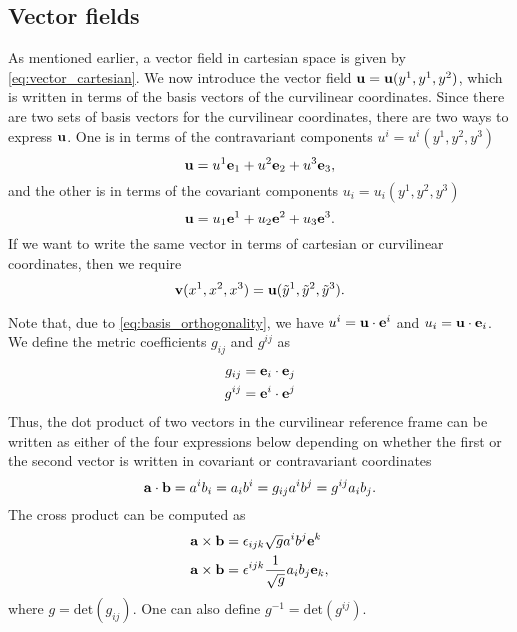 \documentclass[11pt]{article}
\newcommand{\ytilde}{\tilde{y}}
\begin{document}
\subsection{Vector fields}
As mentioned earlier, a vector field in cartesian space is given by \cref{eq:vector_cartesian}. We now introduce the vector field $\mathbf{u} = \mathbf{u}(y^1, y^1, y^2)$, which is written in terms of the basis vectors of the curvilinear coordinates. Since there are two sets of basis vectors for the curvilinear coordinates, there are two ways to express $\mathbf{u}$. One is in terms of the contravariant components $u^i = u^i(y^1, y^2, y^3)$
\begin{equation}
    \mathbf{u} = u^1 \mathbf{e}_1 + u^2 \mathbf{e}_2 + u^3 \mathbf{e}_3,
\end{equation}
and the other is in terms of the covariant components $u_i = u_i(y^1, y^2, y^3)$
\begin{equation}
    \mathbf{u} = u_1 \mathbf{e}^1 + u_2 \mathbf{e}^2 + u_3 \mathbf{e}^3.
\end{equation}
If we want to write the same vector in terms of cartesian or curvilinear coordinates, then we require
\begin{equation}
    \vvec(x^1, x^2, x^3) = \uvec(\ytilde^1, \ytilde^2, \ytilde^3).
\end{equation}

Note that, due to \cref{eq:basis_orthogonality}, we have $u^i = \mathbf{u} \cdot \mathbf{e}^i$ and $u_i = \mathbf{u} \cdot \mathbf{e}_i$. We define the metric coefficients $g_{ij}$ and $g^{ij}$ as
\begin{align}
    g_{ij} &= \mathbf{e}_i \cdot \mathbf{e}_j \\
    g^{ij} &= \mathbf{e}^i \cdot \mathbf{e}^j \\
\end{align}
Thus, the dot product of two vectors in the curvilinear reference frame can be written as either of the four expressions below depending on whether the first or the second vector is written in covariant or contravariant coordinates
\begin{equation}
\mathbf{a} \cdot \mathbf{b} = a^i b_i = a_i b^i = g_{ij} a^i b^j = g^{ij} a_i b_j.
\end{equation}
The cross product can be computed as
\begin{align}
    \mathbf{a} \times \mathbf{b} &= \epsilon_{ijk} \sqrt{g} a^i b^j \mathbf{e}^k \\
    \mathbf{a} \times \mathbf{b} &= \epsilon^{ijk} \frac{1}{\sqrt{g}} a_i b_j \mathbf{e}_k,
\end{align}
where $g = \text{det}(g_{ij})$. One can also define $g^{-1} = \text{det}(g^{ij})$.
\end{document}
